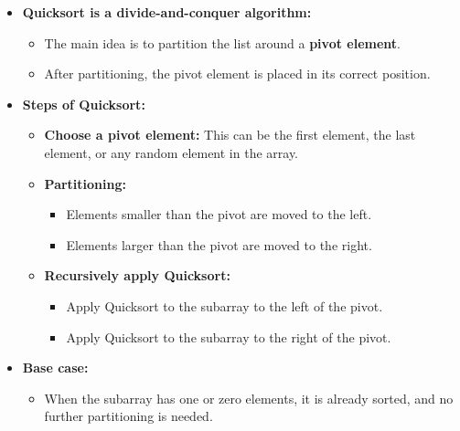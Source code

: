     \begin{intuition}
        \begin{itemize}
            \item \textbf{Quicksort is a divide-and-conquer algorithm:}
            \begin{itemize}
                \item The main idea is to partition the list around a \textbf{pivot element}.
                \item After partitioning, the pivot element is placed in its correct position.
            \end{itemize}
            
            \item \textbf{Steps of Quicksort:}
            \begin{itemize}
                \item \textbf{Choose a pivot element:} This can be the first element, the last element, or any random element in the array.
                \item \textbf{Partitioning:} 
                \begin{itemize}
                    \item Elements smaller than the pivot are moved to the left.
                    \item Elements larger than the pivot are moved to the right.
                \end{itemize}
                \item \textbf{Recursively apply Quicksort:}
                \begin{itemize}
                    \item Apply Quicksort to the subarray to the left of the pivot.
                    \item Apply Quicksort to the subarray to the right of the pivot.
                \end{itemize}
            \end{itemize}
            
            \item \textbf{Base case:}
            \begin{itemize}
                \item When the subarray has one or zero elements, it is already sorted, and no further partitioning is needed.
            \end{itemize}
        \end{itemize}        
    \end{intuition}

